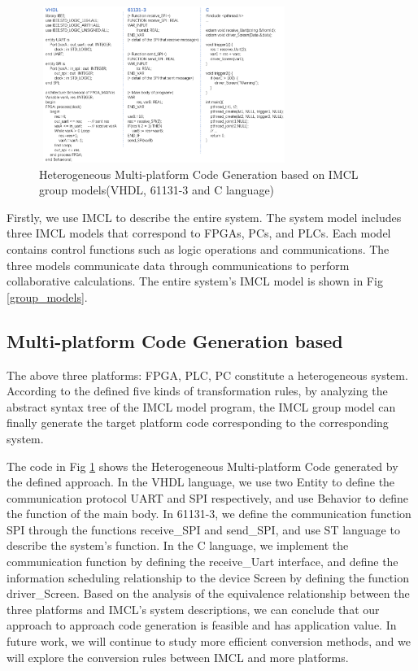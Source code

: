 \begin{figure}[!thb]
  \centering
        \includegraphics[height=2.0in, width=3.2in]{MultiPlatform_codes_generation}
  \caption{Heterogeneous Multi-platform Code Generation based on IMCL group models(VHDL, 61131-3 and C language)}\label{MultiPlatform_codes_generation}
\end{figure}


Firstly, we use IMCL to describe the entire system. The system model includes three IMCL models that correspond to FPGAs, PCs, and PLCs. Each model contains control functions such as logic operations and communications. The three models communicate data through communications to perform collaborative calculations. The entire system's IMCL model is shown in Fig \ref{group_models}.


\subsection{Multi-platform Code Generation based}


The above three platforms: FPGA, PLC, PC constitute a heterogeneous system. According to the defined five kinds of transformation rules, by analyzing the abstract syntax tree of the IMCL model program, the IMCL group model can finally generate the target platform code corresponding to the corresponding system.

The code in Fig \ref{MultiPlatform_codes_generation} shows the Heterogeneous Multi-platform Code generated by the defined approach. In the VHDL language, we use two Entity to define the communication protocol UART and SPI respectively, and use Behavior to define the function of the main body. In 61131-3, we define the communication function SPI through the functions receive\_SPI and send\_SPI, and use ST language to describe the system's function. In the C language, we implement the communication function by defining the receive\_Uart interface, and define the information scheduling relationship to the device Screen by defining the function driver\_Screen. Based on the analysis of the equivalence relationship between the three platforms and IMCL's system descriptions, we can conclude that our approach to approach code generation is feasible and has application value.
In future work, we will continue to study more efficient conversion methods, and we will explore the conversion rules between IMCL and more platforms. 